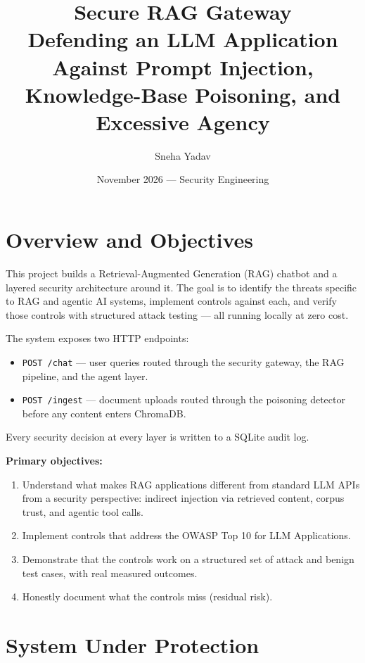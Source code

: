 \documentclass[11pt,a4paper]{article}
\title{\textbf{Secure RAG Gateway}\\
\large Defending an LLM Application Against Prompt Injection,\\
Knowledge-Base Poisoning, and Excessive Agency}
\author{Sneha Yadav}
\date{November 2026 --- Security Engineering}
\begin{document}
\maketitle
\tableofcontents
\newpage

\section{Overview and Objectives}

This project builds a Retrieval-Augmented Generation (RAG) chatbot and a
layered security architecture around it. The goal is to identify the threats
specific to RAG and agentic AI systems, implement controls against each, and
verify those controls with structured attack testing --- all running locally at
zero cost.

The system exposes two HTTP endpoints:
\begin{itemize}[noitemsep]
  \item \texttt{POST /chat} --- user queries routed through the security
        gateway, the RAG pipeline, and the agent layer.
  \item \texttt{POST /ingest} --- document uploads routed through the
        poisoning detector before any content enters ChromaDB.
\end{itemize}

Every security decision at every layer is written to a SQLite audit log.

\textbf{Primary objectives:}
\begin{enumerate}[noitemsep]
  \item Understand what makes RAG applications different from standard LLM APIs
        from a security perspective: indirect injection via retrieved content,
        corpus trust, and agentic tool calls.
  \item Implement controls that address the OWASP Top 10 for LLM Applications.
  \item Demonstrate that the controls work on a structured set of attack and
        benign test cases, with real measured outcomes.
  \item Honestly document what the controls miss (residual risk).
\end{enumerate}

\section{System Under Protection}
\end{document}
